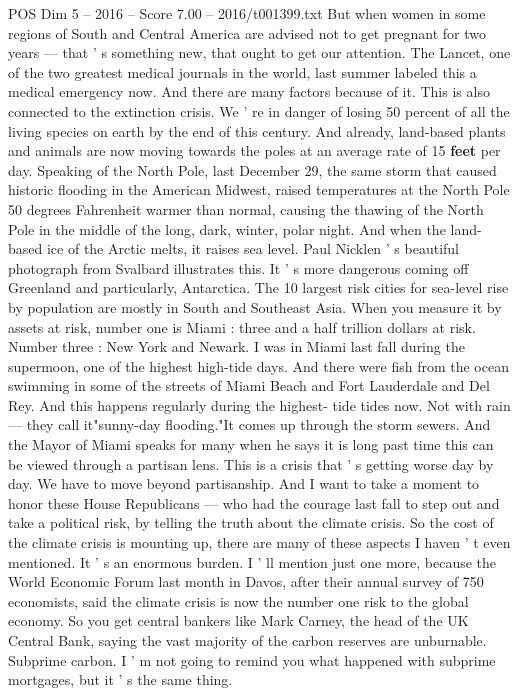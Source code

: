 \begin{textsample}{POS Dim 5 – 2016 – Score 7.00 – 2016/t001399.txt}
But when women in some regions of South and Central America are advised not to get pregnant for two years — that ' s something new, that ought to get our attention.
The Lancet, one of the two greatest medical journals in the world, last summer labeled this a medical emergency now.
And there are many factors because of it.
This is also connected to the extinction crisis.
We ' re in danger of losing 50 percent of all the living species on earth by the end of this century.
And already, land-based plants and animals are now moving towards the poles at an average rate of 15 \textbf{feet} per day.
Speaking of the North Pole, last December 29, the same storm that caused historic flooding in the American Midwest, raised temperatures at the North Pole 50 degrees Fahrenheit warmer than normal, causing the thawing of the North Pole in the middle of the long, dark, winter, polar night.
And when the land- based ice of the Arctic melts, it raises sea level.
Paul Nicklen ' s beautiful photograph from Svalbard illustrates this.
It ' s more dangerous coming off Greenland and particularly, Antarctica.
The 10 largest risk cities for sea-level rise by population are mostly in South and Southeast Asia.
When you measure it by assets at risk, number one is Miami : three and a half trillion dollars at risk.
Number three : New York and Newark.
I was in Miami last fall during the supermoon, one of the highest high-tide days.
And there were fish from the ocean swimming in some of the streets of Miami Beach and Fort Lauderdale and Del Rey.
And this happens regularly during the highest- tide tides now.
Not with rain — they call it"sunny-day flooding."It comes up through the storm sewers.
And the Mayor of Miami speaks for many when he says it is long past time this can be viewed through a partisan lens.
This is a crisis that ' s getting worse day by day.
We have to move beyond partisanship.
And I want to take a moment to honor these House Republicans — who had the courage last fall to step out and take a political risk, by telling the truth about the climate crisis.
So the cost of the climate crisis is mounting up, there are many of these aspects I haven ' t even mentioned.
It ' s an enormous burden.
I ' ll mention just one more, because the World Economic Forum last month in Davos, after their annual survey of 750 economists, said the climate crisis is now the number one risk to the global economy.
So you get central bankers like Mark Carney, the head of the UK Central Bank, saying the vast majority of the carbon reserves are unburnable.
Subprime carbon.
I ' m not going to remind you what happened with subprime mortgages, but it ' s the same thing.

\end{textsample}
